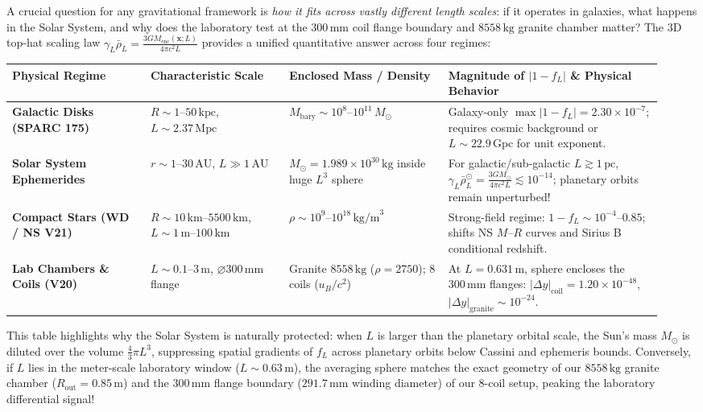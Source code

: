 \documentclass[10pt,a4paper]{article}
\begin{document}
\par
A crucial question for any gravitational framework is \emph{how it fits across vastly different length scales}: if it operates in galaxies, what happens in the Solar System, and why does the laboratory test at the $300\,\text{mm}$ coil flange boundary and $8558\,\text{kg}$ granite chamber matter? The 3D top-hat scaling law $\gamma_L \bar{\rho}_L = \frac{3 G M_{\text{enc}}(\mathbf{x};L)}{4\pi c^2 L}$ provides a unified quantitative answer across four regimes:
\begin{center}\vspace{-2pt}
{\footnotesize
\begin{tabular}{@{}>{\bfseries}p{0.20\linewidth}p{0.20\linewidth}p{0.23\linewidth}p{0.31\linewidth}@{}}
\toprule
Physical Regime & Characteristic Scale & Enclosed Mass / Density & Magnitude of $|1 - f_L|$ \& Physical Behavior \\
\midrule
Galactic Disks (SPARC 175) & $R \sim 1\text{--}50\,\text{kpc}$, $L \sim 2.37\,\text{Mpc}$ & $M_{\text{bary}} \sim 10^8\text{--}10^{11}\,M_\odot$ & Galaxy-only $\max|1-f_L| = 2.30\times 10^{-7}$; requires cosmic background or $L\sim 22.9\,\text{Gpc}$ for unit exponent. \\
Solar System Ephemerides & $r \sim 1\text{--}30\,\text{AU}$, $L \gg 1\,\text{AU}$ & $M_\odot = 1.989\times 10^{30}\,\text{kg}$ inside huge $L^3$ sphere & For galactic/sub-galactic $L \gtrsim 1\,\text{pc}$, $\gamma_L\bar{\rho}_L^\odot = \frac{3GM_\odot}{4\pi c^2 L} \lesssim 10^{-14}$; planetary orbits remain unperturbed! \\
Compact Stars (WD / NS V21) & $R \sim 10\,\text{km}\text{--}5500\,\text{km}$, $L \sim 1\,\text{m}\text{--}100\,\text{km}$ & $\rho \sim 10^9\text{--}10^{18}\,\text{kg/m}^3$ & Strong-field regime: $1-f_L \sim 10^{-4}\text{--}0.85$; shifts NS $M$--$R$ curves and Sirius B conditional redshift. \\
Lab Chambers \& Coils (V20) & $L \sim 0.1\text{--}3\,\text{m}$, $\varnothing 300\,\text{mm}$ flange & Granite $8558\,\text{kg}$ ($\rho=2750$); 8 coils ($u_B/c^2$) & At $L=0.631\,\text{m}$, sphere encloses the $300\,\text{mm}$ flanges: $|\Delta y|_{\text{coil}}=1.20\times 10^{-48}$, $|\Delta y|_{\text{granite}}\sim 10^{-24}$. \\
\bottomrule
\end{tabular}}
\end{center}
This table highlights why the Solar System is naturally protected: when $L$ is larger than the planetary orbital scale, the Sun's mass $M_\odot$ is diluted over the volume $\frac{4}{3}\pi L^3$, suppressing spatial gradients of $f_L$ across planetary orbits below Cassini and ephemeris bounds. Conversely, if $L$ lies in the meter-scale laboratory window ($L \sim 0.63\,\text{m}$), the averaging sphere matches the exact geometry of our $8558\,\text{kg}$ granite chamber ($R_{\text{out}}=0.85\,\text{m}$) and the $300\,\text{mm}$ flange boundary ($291.7\,\text{mm}$ winding diameter) of our 8-coil setup, peaking the laboratory differential signal!
\newpage
\end{document}
